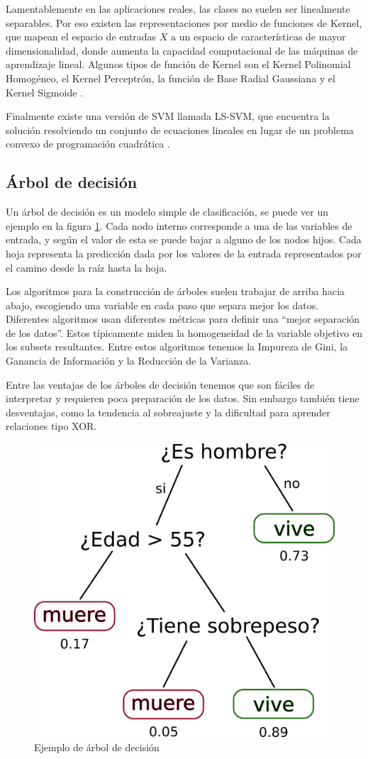 Lamentablemente en las aplicaciones reales, las clases no suelen ser linealmente separables. Por eso existen las representaciones por medio de funciones de Kernel, que mapean el espacio de entradas $X$ a un espacio de características de mayor dimensionalidad, donde aumenta la capacidad computacional de las máquinas de aprendizaje lineal. Algunos tipos de función de Kernel son el Kernel Polinomial Homogéneo, el Kernel Perceptrón, la función de Base Radial Gaussiana y el Kernel Sigmoide \citep{cristianini2000introduction}.

Finalmente existe una versión de \ac{SVM} llamada \ac{LS-SVM}, que encuentra la solución resolviendo un conjunto de ecuaciones lineales en lugar de un problema convexo de programación cuadrática \citep{ak2002least}.

\subsection{Árbol de decisión}

Un árbol de decisión es un modelo simple de clasificación, se puede ver un ejemplo en la figura \ref{fig:dt-eg}. Cada nodo interno corresponde a una de las variables de entrada, y según el valor de esta se puede bajar a alguno de los nodos hijos. Cada hoja representa la predicción dada por los valores de la entrada representados por el camino desde la raíz hasta la hoja.

Los algoritmos para la construcción de árboles suelen trabajar de arriba hacia abajo, escogiendo una variable en cada paso que separa mejor los datos. Diferentes algoritmos usan diferentes métricas para definir una ``mejor separación de los datos''. Estos típicamente miden la homogeneidad de la variable objetivo en los subsets resultantes. Entre estos algoritmos tenemos la Impureza de Gini, la Ganancia de Información y la Reducción de la Varianza.

Entre las ventajas de los árboles de decisión tenemos que son fáciles de interpretar y requieren poca preparación de los datos. Sin embargo también tiene desventajas, como la tendencia al sobreajuste y la dificultad para aprender relaciones tipo XOR.

\begin{figure}[htbp]
	\centering
	\includegraphics[width=0.4\linewidth]{graficos/propios/arbol_decision.png}
	\caption{Ejemplo de árbol de decisión}
	\label{fig:dt-eg}
\end{figure}

